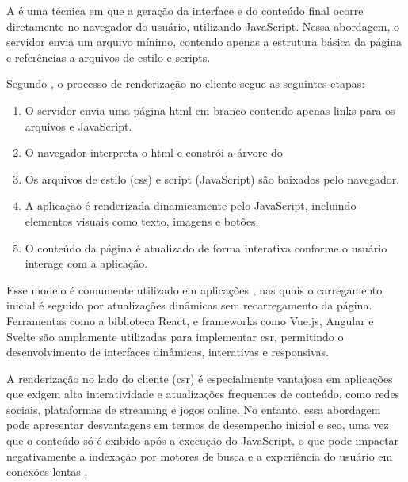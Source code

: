 A \textbf{} é uma técnica em que a geração da interface e do conteúdo final ocorre diretamente no navegador do usuário, utilizando JavaScript. Nessa abordagem, o servidor envia um arquivo  mínimo, contendo apenas a estrutura básica da página e referências a arquivos de estilo e scripts.{\cite{atori2024}}

Segundo , o processo de renderização no cliente segue as seguintes etapas:

\begin{enumerate}
    \item O servidor envia uma página \acrshort{html} em branco contendo apenas links para os arquivos  e JavaScript.
    \item O navegador interpreta o \acrshort{html} e constrói a árvore do 
    \item Os arquivos de estilo (\acrshort{css}) e script (JavaScript) são baixados pelo navegador.
    \item A aplicação é renderizada dinamicamente pelo JavaScript, incluindo elementos visuais como texto, imagens e botões.
    \item O conteúdo da página é atualizado de forma interativa conforme o usuário interage com a aplicação.
\end{enumerate}

Esse modelo é comumente utilizado em aplicações , nas quais o carregamento inicial é seguido por atualizações dinâmicas sem recarregamento da página. Ferramentas como a biblioteca React, e frameworks como Vue.js, Angular e Svelte são amplamente utilizadas para implementar \acrshort{csr}, permitindo o desenvolvimento de interfaces dinâmicas, interativas e responsivas.


A renderização no lado do cliente (\acrshort{csr}) é especialmente vantajosa em aplicações que exigem alta interatividade e atualizações frequentes de conteúdo, como redes sociais, plataformas de streaming e jogos online. No entanto, essa abordagem pode apresentar desvantagens em termos de desempenho inicial e \acrshort{seo}, uma vez que o conteúdo só é exibido após a execução do JavaScript, o que pode impactar negativamente a indexação por motores de busca e a experiência do usuário em conexões lentas \cite{atori2024}.

